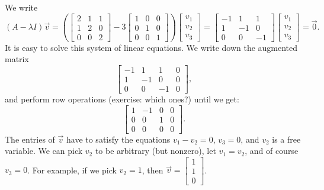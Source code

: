 \begin{example}
We write
\begin{equation*}
(A-\lambda I) \vec{v} = 
\left(
\begin{bmatrix}
2 & 1 & 1 \\
1 & 2 & 0 \\
0 & 0 & 2
\end{bmatrix}
- 3
\begin{bmatrix}
1 & 0 & 0 \\
0 & 1 & 0 \\
0 & 0 & 1
\end{bmatrix}
\right)
\begin{bmatrix}
v_1 \\ v_2 \\ v_3
\end{bmatrix}
=
\begin{bmatrix}
-1 & 1 & 1 \\
1 & -1 & 0 \\
0 & 0 & -1
\end{bmatrix}
\begin{bmatrix}
v_1 \\ v_2 \\ v_3
\end{bmatrix}
=
\vec{0} .
\end{equation*}
It is easy to solve this system of linear equations.  We write down the
augmented matrix
\begin{equation*}
\left[
\begin{array}{ccc|c}
-1 & 1 & 1 & 0 \\
1 & -1 & 0 & 0 \\
0 & 0 & -1 & 0
\end{array}
\right] ,
\end{equation*}
and perform row operations (exercise: which ones?) until we get:
\begin{equation*}
\left[
\begin{array}{ccc|c}
1 & -1 & 0 & 0 \\
0 & 0 & 1 & 0 \\
0 & 0 & 0 & 0
\end{array}
\right] .
\end{equation*}
The entries of $\vec{v}$ have to satisfy the equations
$v_1 - v_2 = 0$, $v_3 = 0$, and $v_2$ is a free variable.  
We can pick $v_2$ to be arbitrary (but nonzero), let
$v_1 = v_2$, and of course $v_3 = 0$.
For example, if we pick $v_2 = 1$, then
$\vec{v} =
\left[ \begin{smallmatrix} 1 \\ 1 \\ 0 \end{smallmatrix} \right]$.

\end{example}

